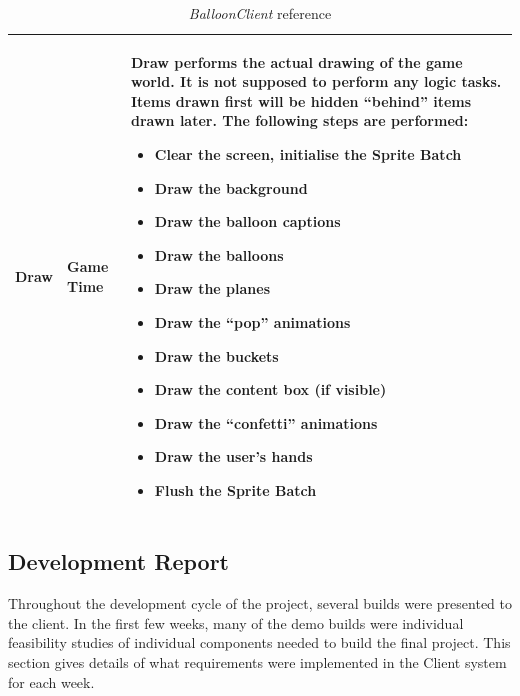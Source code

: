 \begin{table}
\begin{tabular}{|p{2.6cm}|p{3.6cm}|p{9.4cm}|}
Draw & Game Time &
Draw performs the actual drawing of the game world. It is not supposed to 
perform any logic tasks. Items drawn first will be hidden ``behind'' items drawn
later. \newline The following steps are performed:
\begin{itemize}
	\item{Clear the screen, initialise the Sprite Batch}
	\item{Draw the background}
	\item{Draw the balloon captions}
	\item{Draw the balloons}
	\item{Draw the planes}
	\item{Draw the ``pop'' animations}
	\item{Draw the buckets}
	\item{Draw the content box (if visible)}
	\item{Draw the ``confetti'' animations}
	\item{Draw the user's hands}
	\item{Flush the Sprite Batch}
\end{itemize}
\\ \hline
\end{tabular}
\caption{\emph{BalloonClient} reference}

\label{BalloonClientRef}
\end{table}

\clearpage{}
\subsection{Development Report}
Throughout the development cycle of the project, several builds were presented
to the client. In the first few weeks, many of the demo builds were individual
feasibility studies of individual components needed to build the final project.
This section gives details of what requirements were implemented in the Client
system for each week.

